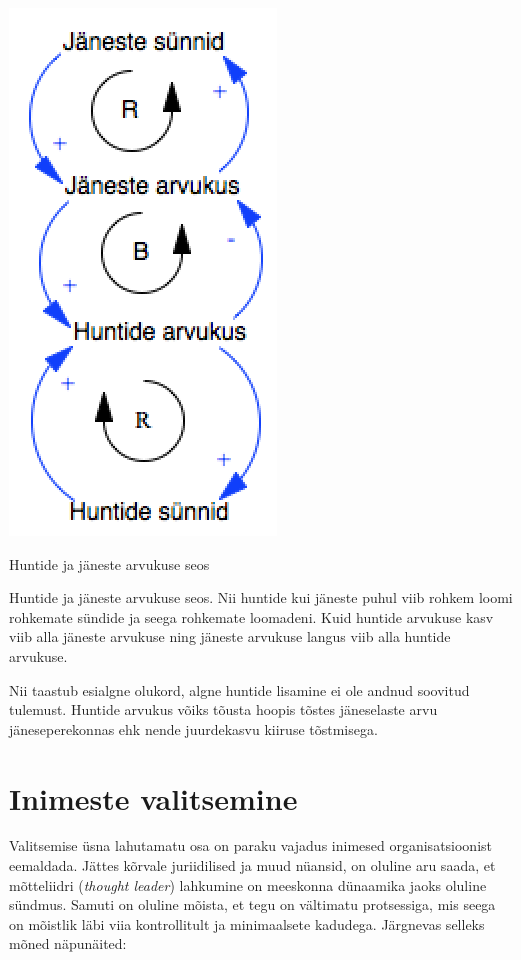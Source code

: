 \begin{marginfigure}
		\begin{center}
		\includegraphics[width=.7\linewidth]{hundid.png}
		\caption{Huntide ja jäneste arvukuse seos}
		\label{fig:wolves}
		\end{center}
	Huntide ja jäneste arvukuse seos. Nii huntide kui jäneste puhul viib rohkem loomi rohkemate sündide ja seega rohkemate loomadeni. Kuid huntide arvukuse kasv viib alla jäneste arvukuse ning jäneste arvukuse langus viib alla huntide arvukuse.
\end{marginfigure}

Nii taastub esialgne olukord, algne huntide lisamine ei ole andnud soovitud tulemust. Huntide arvukus võiks tõusta hoopis tõstes jäneselaste arvu jäneseperekonnas ehk nende juurdekasvu kiiruse tõstmisega. 

\section{Inimeste valitsemine}
Valitsemise üsna lahutamatu osa on paraku vajadus inimesed organisatsioonist eemaldada. Jättes kõrvale juriidilised ja muud nüansid, on oluline aru saada, et mõtteliidri (\emph{thought leader}) lahkumine on meeskonna dünaamika jaoks oluline sündmus. Samuti on oluline mõista, et tegu on vältimatu protsessiga, mis seega on mõistlik läbi viia kontrollitult ja minimaalsete kadudega. Järgnevas selleks mõned näpunäited: 

